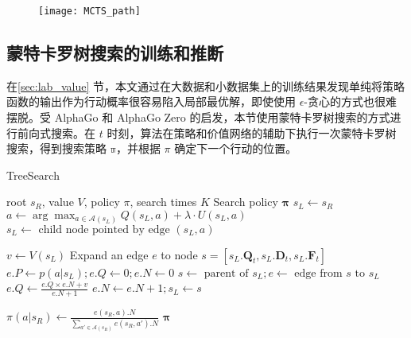 \begin{figure}[!htbp]
    \centering
    \texttt{[image: MCTS\_path]}
    \label{fig:MCTS_path}
\end{figure}

\subsection{蒙特卡罗树搜索的训练和推断}
\label{sec:MCTS_train}
在\ref{sec:lab_value} 节，本文通过在大数据和小数据集上的训练结果发现单纯将策略函数的输出作为行动概率很容易陷入局部最优解，即使使用 $\epsilon$-贪心的方式也很难摆脱。受 AlphaGo 和 AlphaGo Zero 的启发，本节使用蒙特卡罗树搜索的方式进行前向式搜索。在 $t$ 时刻，算法在策略和价值网络的辅助下执行一次蒙特卡罗树搜索，得到搜索策略 $\mathbb{\pi}$，并根据 $\pi$ 确定下一个行动的位置。

\begin{algorithm}[!htbp]
\caption{TreeSearch}\label{alg:TreeSearch}
\renewcommand{\algorithmicrequire}{\textbf{Input:}}
\renewcommand{\algorithmicensure}{\textbf{Output:}}
\begin{algorithmic}[1]
\Require root $s_R$, value $V$, policy $\pi$, search times $K$
\Ensure Search policy $\mathbf{\pi}$
\State $s_L\leftarrow s_R$
  \State $a \leftarrow \arg\max_{a\in\mathcal{A}(s_L)} Q(s_L, a) +\lambda \cdot U(s_L, a)$
  \State $s_L \leftarrow \textrm{ child node pointed by edge }(s_L, a)$
\EndWhile

    \State $v\leftarrow V(s_L)$ 
    \State Expand an edge $e$ to node $ s = [s_L.\mathbf{Q}_t, s_L.\mathbf{D}_t, s_L.\mathbf{F}_t]$
    \State $e.P \leftarrow p(a|s_L); e.Q \leftarrow 0; e.N \leftarrow  0$
  \EndFor
{}
  \State $s \leftarrow \textrm{ parent of }s_L; e \leftarrow \textrm{ edge from }s\textrm{ to }s_L$
  \State $e.Q \leftarrow \frac{e.Q\times e.N + v}{e.N + 1}$
  \State $e.N \leftarrow e.N + 1; s_L \leftarrow s$
\EndWhile
\EndFor

  \State $\pi(a|s_R)\leftarrow \frac{e(s_R, a).N}{\sum_{a'\in\mathcal{A}(s_R)}e(s_R, a').N}$
\EndFor
\Return $\mathbf{\pi}$
\end{algorithmic}
\end{algorithm}


